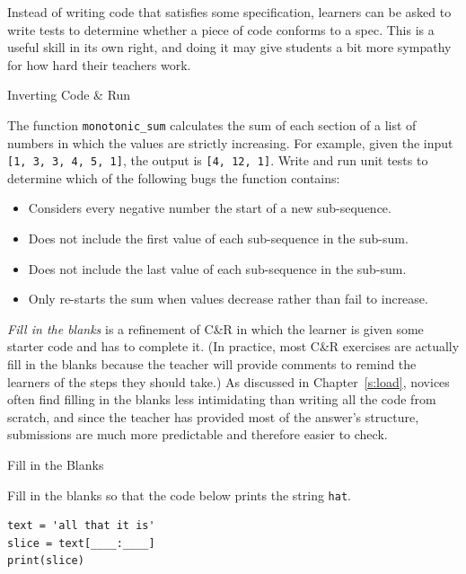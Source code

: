 Instead of writing code that satisfies some specification, learners can
be asked to write tests to determine whether a piece of code conforms to
a spec. This is a useful skill in its own right, and doing it may give
students a bit more sympathy for how hard their teachers work.

\begin{aside}{Inverting Code \& Run}

The function \texttt{monotonic\_sum} calculates the sum of each section of a
list of numbers in which the values are strictly increasing. For
example, given the input \texttt{{[}1,\ 3,\ 3,\ 4,\ 5,\ 1{]}}, the output is
\texttt{{[}4,\ 12,\ 1{]}}. Write and run unit tests to determine which of the
following bugs the function contains:

\begin{itemize}
\item
  Considers every negative number the start of a new sub-sequence.
\item
  Does not include the first value of each sub-sequence in the
  sub-sum.
\item
  Does not include the last value of each sub-sequence in the
  sub-sum.
\item
  Only re-starts the sum when values decrease rather than fail to
  increase.
\end{itemize}

\end{aside}

\emph{Fill in the blanks} is a refinement of C\&R in which the learner is
given some starter code and has to complete it. (In practice, most C\&R
exercises are actually fill in the blanks because the teacher will
provide comments to remind the learners of the steps they should take.)
As discussed in Chapter~\ref{s:load}, novices often find filling in the
blanks less intimidating than writing all the code from scratch, and
since the teacher has provided most of the answer's structure,
submissions are much more predictable and therefore easier to check.

\begin{aside}{Fill in the Blanks}

Fill in the blanks so that the code below prints the string \texttt{\textquotesingle{}hat\textquotesingle{}}.

\begin{verbatim}
text = 'all that it is'
slice = text[____:____]
print(slice)
\end{verbatim}

\end{aside}

